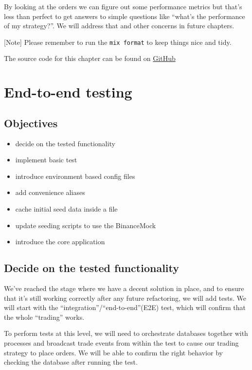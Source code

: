 \documentclass[
  oneside]{book}
\providecommand{\tightlist}{%
  \setlength{\itemsep}{0pt}\setlength{\parskip}{0pt}}
\begin{document}
By looking at the orders we can figure out some performance metrics but that's less than perfect to get answers to simple questions like ``what's the performance of my strategy?''. We will address that and other concerns in future chapters.

{[}Note{]} Please remember to run the \texttt{mix\ format} to keep things nice and tidy.

The source code for this chapter can be found on \href{https://github.com/Cinderella-Man/hands-on-elixir-and-otp-cryptocurrency-trading-bot-source-code/tree/chapter_15}{GitHub}

\chapter{End-to-end testing}\label{end-to-end-testing}

\section{Objectives}\label{objectives-15}

\begin{itemize}
\tightlist
\item
  decide on the tested functionality
\item
  implement basic test
\item
  introduce environment based config files
\item
  add convenience aliases
\item
  cache initial seed data inside a file
\item
  update seeding scripts to use the BinanceMock
\item
  introduce the core application
\end{itemize}

\section{Decide on the tested functionality}\label{decide-on-the-tested-functionality}

We've reached the stage where we have a decent solution in place, and to ensure that it's still working correctly after any future refactoring, we will add tests. We will start with the ``integration''/``end-to-end''(E2E) test, which will confirm that the whole ``trading'' works.

To perform tests at this level, we will need to orchestrate databases together with processes and broadcast trade events from within the test to cause our trading strategy to place orders. We will be able to confirm the right behavior by checking the database after running the test.
\end{document}
